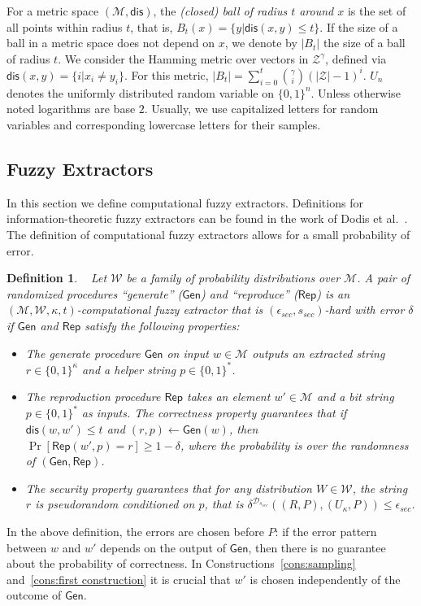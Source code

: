 \documentclass[11pt]{article}
\newtheorem{definition}[theorem]{Definition}
\newcommand{\class}[1]{{\ensuremath{\mathsf{#1}}}}
\newcommand{\gen}{\ensuremath{\class{Gen}}\xspace}
\newcommand{\rep}{\ensuremath{\class{Rep}}\xspace}
\newcommand{\dis}{\ensuremath{\mathsf{dis}}}
\begin{document}
For a metric space $(\mathcal{M}, \dis)$, the \emph{(closed) ball of radius $t$ around $x$} is the set of all points within radius $t$, that is, $B_t(x) = \{y| \dis(x, y)\leq t\}$.  If the size of a ball in a metric space does not depend on $x$, we denote by $|B_t|$ the size of a ball of radius $t$.  We consider the Hamming metric over vectors in $\mathcal{Z}^\gamma$, defined via $\dis(x,y) = \{i | x_i \neq y_i\}$.  For this metric, $|B_t| = \sum_{i=0}^t {\gamma \choose i} (|\mathcal{Z}|-1)^i $.  $U_n$ denotes the uniformly  distributed random variable on $\{0,1\}^n$.  Unless otherwise noted logarithms are base $2$.
Usually, we use capitalized letters for random variables and corresponding lowercase letters for their samples.

\subsection{Fuzzy Extractors}
\label{sec:fuzzy extractors}

In this section we define computational fuzzy extractors.  Definitions for information-theoretic fuzzy extractors can be found in the work of Dodis et al.~\cite[Sections 2.5--4.1]{DBLP:journals/siamcomp/DodisORS08}.  The definition of computational fuzzy extractors allows for a small probability of error.  %

\begin{definition}~\cite[Definition 2.5]{fuller2013computational}
\label{def:comp fuzzy extractor}
Let $\mathcal{W}$ be a family of probability distributions over $\mathcal{M}$. A pair of randomized procedures ``generate'' ($\gen$) and ``reproduce'' ($\rep$) is an $(\mathcal{M}, \mathcal{W}, \kappa, t)$-\emph{computational fuzzy extractor} that is $(\epsilon_{sec}, s_{sec})$-hard with error $\delta$ if \gen and \rep satisfy the following properties:
\begin{itemize}
\item The generate procedure \gen on input $w\in \mathcal{M}$ outputs an extracted string $r\in\{0,1\}^\kappa$ and a helper string $p\in\{0,1\}^*$.
\item The reproduction procedure \rep takes an element $w'\in\mathcal{M}$ and a bit string $p\in\{0,1\}^*$ as inputs.  The \emph{correctness} property guarantees that if $\dis(w, w')\leq t$ and $(r, p)\leftarrow \gen(w)$, then $\Pr[\rep( w', p) = r] \geq 1-\delta$, where the probability is over the randomness of $(\gen, \rep)$.
\item The \emph{security} property guarantees that for any distribution $W\in \mathcal{W}$, the string $r$ is pseudorandom conditioned on $p$, that is $\delta^{\mathcal{D}_{s_{sec}}}((R, P), (U_\kappa, P))\leq \epsilon_{sec}$.
\end{itemize}
\end{definition}
In the above definition, the errors are chosen before $P$: if the error pattern between $w$ and $w'$ depends on the output of $\gen$, then there is no guarantee about the probability of correctness. In Constructions~\ref{cons:sampling} and~\ref{cons:first construction} it is crucial that $w'$ is chosen independently of the outcome of \gen.
\end{document}
